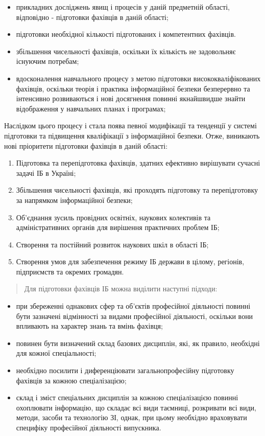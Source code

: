 \begin{itemize}
\item{прикладних досліджень явищ і процесів у даній предметній області, відповідно - підготовки фахівців в даній області;}
\item{підготовки необхідної кількості підготованих і компетентних фахівців.
}
\item{збільшення чисельності фахівців, оскільки їх кількість не задовольняє існуючим потребам;}
\item{вдосконалення навчального процесу з метою підготовки висококваліфікованих фахівців, оскільки теорія і практика інформаційної безпеки безперервно та інтенсивно розвиваються і нові досягнення повинні якнайшвидше знайти відображення у навчальних планах і програмах;}
\end{itemize}

Наслідком цього процесу і стала поява певної модифікації та тенденції у системі підготовки та підвищення кваліфікації з інформаційної безпеки.
Отже, виникають нові пріоритети підготовки фахівців в даній області:
\begin{enumerate}
\item Підготовка та перепідготовка фахівців, здатних ефективно вирішувати сучасні задачі ІБ в Україні;
\item Збільшення чисельності фахівців, які проходять підготовку та перепідготовку за напрямком інформаційної безпеки;
\item Об'єднання зусиль провідних освітніх, наукових колективів та адміністративних органів для вирішення практичних проблем ІБ;
\item Створення та постійний розвиток наукових шкіл в області ІБ;
\item Створення умов для забезпечення режиму ІБ держави в цілому, регіонів, підприємств та окремих громадян.
\end{enumerate}

\begin{quote}
Для підготовки фахівців ІБ можна виділити наступні підходи:
\end{quote}
\begin{itemize}
\item {} 
при збереженні однакових сфер та об'єктів професійної діяльності повинні бути зазначені відмінності за видами професійної діяльності, оскільки вони впливають на характер знань та вмінь фахівця;

\item {} 
повинен бути визначений склад базових дисциплін, які, як правило, необхідні для кожної спеціальності;

\item {} 
необхідно посилити і диференціювати загальнопрофесійну підготовку фахівців за кожною спеціалізацією;

\item {} 
склад і зміст спеціальних дисциплін за кожною спеціалізацією повинні охоплювати інформацію, що складає всі види таємниці, розкривати всі види, методи, засоби та технологію ЗІ, однак, при цьому необхідно враховувати специфіку професійної діяльності випускника.

\end{itemize}


